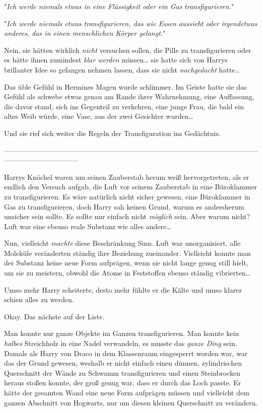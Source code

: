 {"\emph{Ich werde niemals etwas in eine Flüssigkeit oder ein Gas} \emph{transfigurieren.}"

"\emph{Ich werde niemals etwas transfigurieren, das wie Essen aussieht oder irgendetwas anderes, das in einen menschlichen Körper gelangt.}"

Nein, sie hätten wirklich \emph{nicht} versuchen sollen, die Pille zu transfigurieren oder es hätte ihnen zumindest \emph{klar werden} müssen… sie hatte sich von Harrys brillanter Idee so gefangen nehmen lassen, dass sie nicht \emph{nachgedacht} hatte…

Das üble Gefühl in Hermines Magen wurde schlimmer. Im Geiste hatte sie das Gefühl als schwebe etwas genau am Rande ihrer Wahrnehmung, eine Auffassung, die davor stand, sich ins Gegenteil zu verkehren, eine junge Frau, die bald ein altes Weib würde, eine Vase, aus der zwei Gesichter wurden…

Und sie rief sich weiter die Regeln der Transfiguration ins Gedächtnis.

--------------------------------------------------------------------------------------------------------------------------------------------

Harrys Knöchel waren um seinen Zauberstab herum weiß hervorgetreten, als er endlich den Versuch aufgab, die Luft vor seinem Zauberstab in eine Büroklammer zu transfigurieren. Es wäre natürlich nicht sicher gewesen, eine Büroklammer in Gas zu transfigurieren, doch Harry sah keinen Grund, warum es andersherum unsicher sein sollte. Es sollte nur einfach nicht \emph{möglich} sein. Aber warum nicht? Luft war eine ebenso reale Substanz wie alles andere…

Nun, vielleicht \emph{machte} diese Beschränkung Sinn. Luft war unorganisiert, alle Moleküle veränderten ständig ihre Beziehung zueinander. Vielleicht konnte man der Substanz keine neue Form aufprägen, wenn sie nicht lange genug still hielt, um sie zu meistern, obwohl die Atome in Feststoffen ebenso ständig vibrierten…

Umso mehr Harry scheiterte, desto mehr fühlte er die Kälte und umso klarer schien alles zu werden.

Okay. Das nächste auf der Liste.

Man konnte nur ganze Objekte im Ganzen transfigurieren. Man konnte kein \emph{halbes} Streichholz in eine Nadel verwandeln, es musste das \emph{ganze Ding} sein. Damals als Harry von Draco in dem Klassenraum eingesperrt worden war, war das der Grund gewesen, weshalb er nicht einfach einen dünnen, zylindrischen Querschnitt der Wände zu Schwamm transfigurieren und einen Steinbrocken heraus stoßen konnte, der groß genug war, dass er durch das Loch passte. Er hätte der gesamten Wand eine neue Form aufprägen müssen und vielleicht dem ganzen Abschnitt von Hogwarts, nur um diesen kleinen Querschnitt zu verändern.

}
